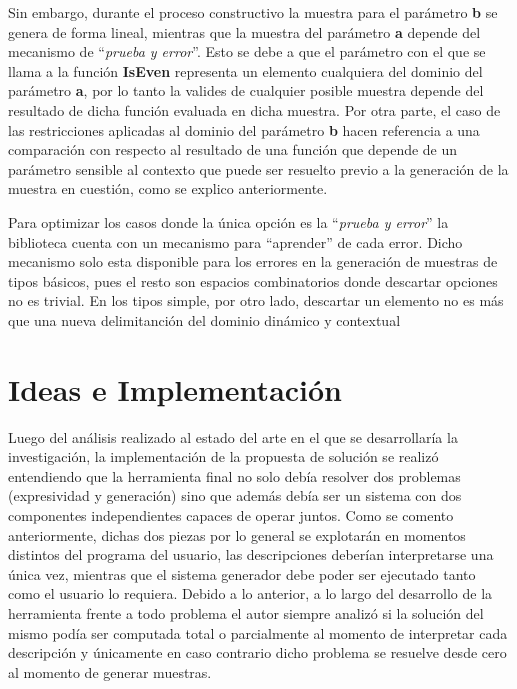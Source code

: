 Sin embargo, durante el proceso constructivo la muestra para el parámetro {\bf b} se genera de forma lineal, mientras que la
muestra del parámetro {\bf a} depende del mecanismo de “{\it prueba y error}”. Esto se debe a que el parámetro con el que se llama
a la función {\bf IsEven} representa un elemento cualquiera del dominio del parámetro {\bf a}, por lo tanto la valides de cualquier
posible muestra depende del resultado de dicha función evaluada en dicha muestra. Por otra parte, el caso de las
restricciones aplicadas al dominio del parámetro {\bf b} hacen referencia a una comparación con respecto al resultado de una
función que depende de un parámetro sensible al contexto que puede ser resuelto previo a la generación de la muestra en
cuestión, como se explico anteriormente.

Para optimizar los casos donde la única opción es la “{\it prueba y error}” la biblioteca cuenta con un mecanismo para “aprender”
de cada error. Dicho mecanismo solo esta disponible para los errores en la generación de muestras de tipos básicos, pues el
resto son espacios combinatorios donde descartar opciones no es trivial. En los tipos simple, por otro lado, descartar un
elemento no es más que una nueva delimitanción del dominio dinámico y contextual

\section{Ideas e Implementación}


Luego del análisis realizado al estado del arte en el que se desarrollaría la investigación, la implementación de
la propuesta de solución se realizó entendiendo que la herramienta final no solo debía resolver dos problemas
(expresividad y generación) sino que además debía ser un sistema con dos componentes independientes capaces de
operar juntos. Como se comento anteriormente, dichas dos piezas por lo general se explotarán en momentos distintos
del programa del usuario, las descripciones deberían interpretarse una única vez, mientras que el sistema generador
debe poder ser ejecutado tanto como el usuario lo requiera. Debido a lo anterior, a lo largo del desarrollo de la
herramienta frente a todo problema el autor siempre analizó si la solución del mismo podía ser computada total o
parcialmente al momento de interpretar cada descripción y únicamente en caso contrario dicho problema se resuelve desde
cero al momento de generar muestras.

